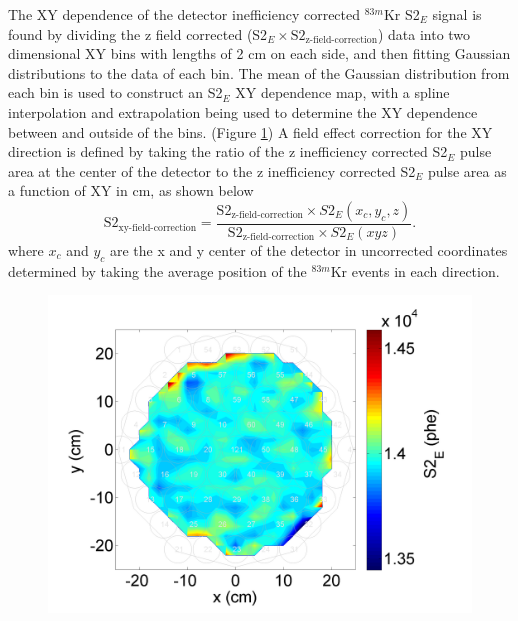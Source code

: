 The XY dependence of the detector inefficiency corrected $^{83m}$Kr S2$_E$ signal is found by dividing the z field corrected (S2$_E \times \mbox{S}2_{\mbox{z-field-correction}}$) data into two dimensional XY bins with lengths of 2 cm on each side, and then fitting Gaussian distributions to the data of each bin.  The mean of the Gaussian distribution from each bin is used to construct an S2$_E$ XY dependence map, with a spline interpolation and extrapolation being used to determine the XY dependence between and outside of the bins. (Figure \ref{fig:KrXYDep}) A field effect correction for the XY direction is defined by taking the ratio of the z inefficiency corrected S2$_E$ pulse area at the center of the detector to the z inefficiency corrected S2$_E$ pulse area as a function of XY in cm, as shown below
\begin{equation}
\mbox{S}2_{\mbox{xy-field-correction}} = \frac{\mbox{S}2_{\mbox{z-field-correction}}\times S2_E(x_c,y_c,z)}{\mbox{S}2_{\mbox{z-field-correction}}\times S2_E(xyz)}.
\end{equation} 
where $x_c$ and $y_c$ are the x and y center of the detector in uncorrected coordinates determined by taking the average position of the $^{83m}$Kr events in each direction.

\begin{figure}[!h]
\includegraphics[scale=0.45]{Run04Corrections/Kr_S2_XYDep.png}
 \label{fig:KrXYDep}
\end{figure}

